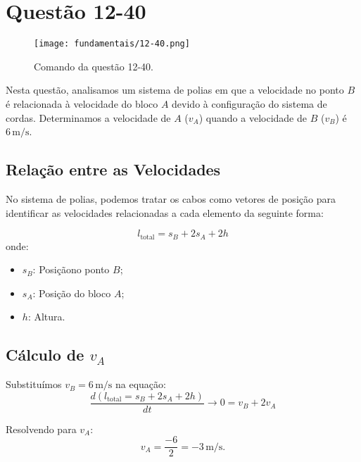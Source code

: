 \newpage
\section{Questão 12-40}

\begin{figure}[H]
	\centering
	\texttt{[image: fundamentais/12-40.png]}
	\caption{Comando da questão 12-40.}\label{fig:12-40}
\end{figure}

Nesta questão, analisamos um sistema de polias em que a velocidade no ponto \(B\) é relacionada à velocidade do bloco \(A\) devido à configuração do sistema de cordas. Determinamos a velocidade de \(A\) (\(v_A\)) quando a velocidade de \(B\) (\(v_B\)) é \(6 \, \text{m/s}\).

\subsection*{Relação entre as Velocidades}
No sistema de polias, podemos tratar os cabos como vetores de posição para identificar as velocidades relacionadas a cada elemento da seguinte forma:

\[
l_{\text{total}} = s_B + 2s_A + 2h
\]
onde:
\begin{itemize}
    \item \(s_B\): Posiçãono ponto \(B\);
    \item \(s_A\): Posição do bloco \(A\);
    \item \(h\): Altura.
\end{itemize}

\subsection*{Cálculo de \(v_A\)}
Substituímos \(v_B = 6 \, \text{m/s}\) na equação:
\[
\frac{d\left(l_{\text{total}} = s_B + 2s_A + 2h\right)}{dt} \rightarrow 0 = v_B + 2v_A
\]

Resolvendo para \(v_A\):
\[
v_A = \frac{-6}{2} = -3 \, \text{m/s}.
\]